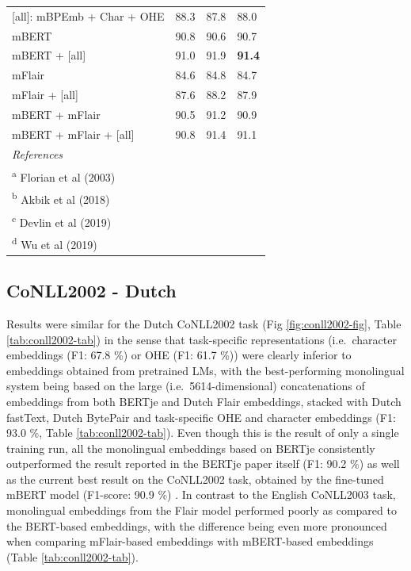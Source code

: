 \documentclass[12pt,a4paper,]{book}
\begin{document}
\begin{table}
\begin{tabular}[t]{llll}
\hspace{1em}[all]: mBPEmb + Char + OHE & 88.3 & 87.8 & 88.0\\
\hspace{1em}mBERT & 90.8 & 90.6 & 90.7\\
\hspace{1em}mBERT + [all] & 91.0 & 91.9 & \textbf{91.4}\\
\hspace{1em}mFlair & 84.6 & 84.8 & 84.7\\
\hspace{1em}mFlair + [all] & 87.6 & 88.2 & 87.9\\
\hspace{1em}mBERT + mFlair & 90.5 & 91.2 & 90.9\\
\hspace{1em}mBERT + mFlair + [all] & 90.8 & 91.4 & 91.1\\
\bottomrule
\multicolumn{4}{l}{\textit{References}}\\
\multicolumn{4}{l}{\textsuperscript{a} Florian et al (2003)}\\
\multicolumn{4}{l}{\textsuperscript{b} Akbik et al (2018)}\\
\multicolumn{4}{l}{\textsuperscript{c} Devlin et al (2019)}\\
\multicolumn{4}{l}{\textsuperscript{d} Wu et al (2019)}\\
\end{tabular}
\end{table}



\hypertarget{conll2002---dutch}{%
\subsection{CoNLL2002 - Dutch}\label{conll2002---dutch}}

Results were similar for the Dutch CoNLL2002 task (Fig \ref{fig:conll2002-fig}, Table \ref{tab:conll2002-tab}) in the sense that task-specific representations (i.e.~character embeddings (F1: 67.8 \%) or OHE (F1: 61.7 \%)) were clearly inferior to embeddings obtained from pretrained LMs, with the best-performing monolingual system being based on the large (i.e.~5614-dimensional) concatenations of embeddings from both BERTje and Dutch Flair embeddings, stacked with Dutch fastText, Dutch BytePair and task-specific OHE and character embeddings (F1: 93.0 \%, Table \ref{tab:conll2002-tab}). Even though this is the result of only a single training run, all the monolingual embeddings based on BERTje consistently outperformed the result reported in the BERTje paper itself (F1: 90.2 \%) \citep{devries2019} as well as the current best result on the CoNLL2002 task, obtained by the fine-tuned mBERT model (F1-score: 90.9 \%) \citep{wu2019}. In contrast to the English CoNLL2003 task, monolingual embeddings from the Flair model performed poorly as compared to the BERT-based embeddings, with the difference being even more pronounced when comparing mFlair-based embeddings with mBERT-based embeddings (Table \ref{tab:conll2002-tab}).
\end{document}

